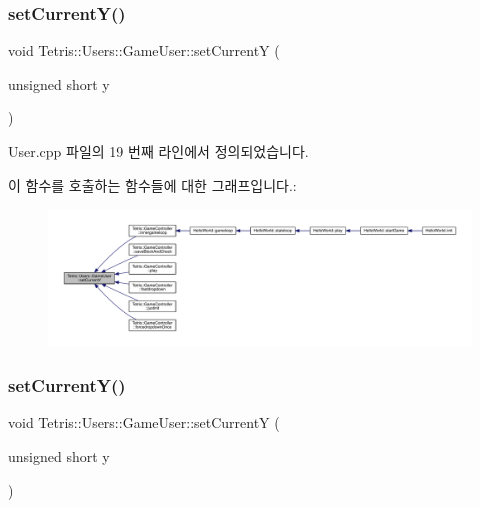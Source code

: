 \subsubsection{\texorpdfstring{set\+Current\+Y()}{setCurrentY()}\hspace{0.1cm}{\footnotesize\ttfamily [1/2]}}
{\footnotesize\ttfamily void Tetris\+::\+Users\+::\+Game\+User\+::set\+CurrentY (\begin{DoxyParamCaption}\item[{unsigned short}]{y }\end{DoxyParamCaption})}



User.\+cpp 파일의 19 번째 라인에서 정의되었습니다.

이 함수를 호출하는 함수들에 대한 그래프입니다.\+:
\nopagebreak
\begin{figure}[H]
\begin{center}
\leavevmode
\includegraphics[width=350pt]{class_tetris_1_1_users_1_1_game_user_aeedbe521004c22018b73a509e99f7d81_icgraph}
\end{center}
\end{figure}
\mbox{\label{class_tetris_1_1_users_1_1_game_user_aeedbe521004c22018b73a509e99f7d81}} 
\subsubsection{\texorpdfstring{set\+Current\+Y()}{setCurrentY()}\hspace{0.1cm}{\footnotesize\ttfamily [2/2]}}
{\footnotesize\ttfamily void Tetris\+::\+Users\+::\+Game\+User\+::set\+CurrentY (\begin{DoxyParamCaption}\item[{unsigned short}]{y }\end{DoxyParamCaption})\hspace{0.3cm}{\ttfamily [inline]}}

